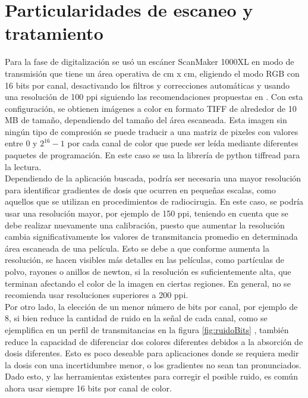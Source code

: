 \section{Particularidades de escaneo y tratamiento}
Para la fase de digitalización se usó un escáner ScanMaker 1000XL en modo de transmisión que tiene un área operativa de cm x cm, eligiendo el modo RGB con 16 bits por canal, desactivando los filtros y correcciones automáticas y usando una resolución de 100 ppi siguiendo las recomendaciones propuestas en \cite{Devic2016}. Con esta configuración, se obtienen imágenes a color en formato TIFF de alrededor de 10 MB de tamaño, dependiendo del tamaño del área escaneada. Esta imagen sin ningún tipo de compresión se puede traducir a una matriz de pixeles con valores entre $0$ y $2^{16}-1$ por cada canal de color que puede ser leída mediante diferentes paquetes de programación. En este caso se usa la librería de python tiffread para la lectura. \\

Dependiendo de la aplicación buscada, podría ser necesaria una mayor resolución para identificar gradientes de dosis que ocurren en pequeñas escalas, como aquellos que se utilizan en procedimientos de radiocirugia. En este caso, se podría usar una resolución mayor, por ejemplo de 150 ppi, teniendo en cuenta que se debe realizar nuevamente una calibración, puesto que aumentar la resolución cambia significativamente los valores de transmitancia promedio en determinada área escaneada de una película. Esto se debe a que conforme aumenta la resolución, se hacen visibles más detalles en las películas, como partículas de polvo, rayones o anillos de newton, si la resolución es suficientemente alta, que terminan afectando el color de la imagen en ciertas regiones. En general, no se recomienda usar resoluciones superiores a 200 ppi.\\

Por otro lado, la elección de un menor número de bits por canal, por ejemplo de 8, si bien reduce la cantidad de ruido en la señal de cada canal, como se ejemplifica en un perfil de transmitancias en la figura \ref{fig:ruidoBits} , también reduce la capacidad de diferenciar dos colores diferentes debidos a la absorción de dosis diferentes. Esto es poco deseable para aplicaciones donde se requiera medir la dosis con una incertidumbre menor, o los gradientes no sean tan pronunciados. Dado esto, y las herramientas existentes para corregir el posible ruido, es común ahora usar siempre 16 bits por canal de color.\\

